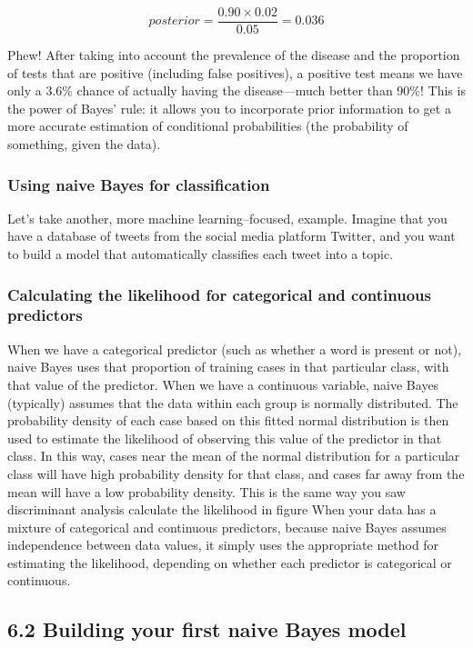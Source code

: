 \documentclass[
]{article}
\begin{document}
\[
posterior = \frac{0.90 \times 0.02}{0.05} = 0.036
\]

Phew! After taking into account the prevalence of the disease and the
proportion of tests that are positive (including false positives), a
positive test means we have only a 3.6\% chance of actually having the
disease---much better than 90\%! This is the power of Bayes' rule: it
allows you to incorporate prior information to get a more accurate
estimation of conditional probabilities (the probability of something,
given the data).

\subsubsection{Using naive Bayes for
classification}\label{using-naive-bayes-for-classification}

Let's take another, more machine learning--focused, example. Imagine
that you have a database of tweets from the social media platform
Twitter, and you want to build a model that automatically classifies
each tweet into a topic.

\subsubsection{Calculating the likelihood for categorical and continuous
predictors}\label{calculating-the-likelihood-for-categorical-and-continuous-predictors}

When we have a categorical predictor (such as whether a word is present
or not), naive Bayes uses that proportion of training cases in that
particular class, with that value of the predictor. When we have a
continuous variable, naive Bayes (typically) assumes that the data
within each group is normally distributed. The probability density of
each case based on this fitted normal distribution is then used to
estimate the likelihood of observing this value of the predictor in that
class. In this way, cases near the mean of the normal distribution for a
particular class will have high probability density for that class, and
cases far away from the mean will have a low probability density. This
is the same way you saw discriminant analysis calculate the likelihood
in figure When your data has a mixture of categorical and continuous
predictors, because naive Bayes assumes independence between data
values, it simply uses the appropriate method for estimating the
likelihood, depending on whether each predictor is categorical or
continuous.

\subsection{6.2 Building your first naive Bayes
model}\label{building-your-first-naive-bayes-model}
\end{document}
